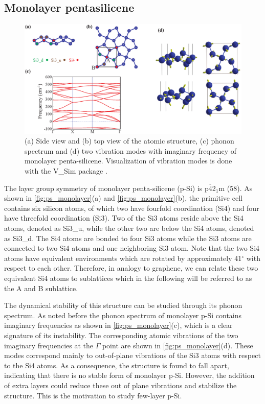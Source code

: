 \subsection{Monolayer pentasilicene}\label{mono}

\begin{figure}[htb]
\centering
\includegraphics[width=\linewidth]{ps_monolayer.eps}%
\caption{(a) Side view and (b) top view of the atomic structure, (c) phonon spectrum and (d) two vibration modes with imaginary frequency of monolayer penta-silicene. Visualization of vibration modes is done with the V\_Sim package \cite{VSim}. \label{fig:ps_monolayer}}
\end{figure}

The layer group symmetry of monolayer penta-silicene (p-Si) is p$\overline{4}$2$_1$m (58). As shown in \autoref{fig:ps_monolayer}(a) and \autoref{fig:ps_monolayer}(b), the primitive cell contains six silicon atoms, of which two have fourfold coordination (Si4) and four have threefold coordination (Si3). Two of the Si3 atoms reside above the Si4 atoms, denoted as Si3\_u, while the other two are below the Si4 atoms, denoted as Si3\_d. The Si4 atoms are bonded to four Si3 atoms while the Si3 atoms are connected to two Si4 atoms and one neighboring Si3 atom. Note that the two Si4 atoms have equivalent environments which are rotated by approximately 41$^{\circ}$ with respect to each other. Therefore, in analogy to graphene, we can relate these two equivalent Si4 atoms to sublattices which in the following will be referred to as the A and B sublattice.

The dynamical stability of this structure can be studied through its phonon spectrum. As noted before\cite{Ding2015,Li2015b} the phonon spectrum of monolayer p-Si contains imaginary frequencies as shown in \autoref{fig:ps_monolayer}(c), which is a clear signature of its instability. The corresponding atomic vibrations of the two imaginary frequencies at the $\Gamma$ point are shown in \autoref{fig:ps_monolayer}(d). These modes correspond mainly to out-of-plane vibrations of the Si3 atoms with respect to the Si4 atoms. As a consequence, the structure is found to fall apart, indicating that there is no stable form of monolayer p-Si. However, the addition of extra layers could reduce these out of plane vibrations and stabilize the structure. This is the motivation to study few-layer p-Si.


